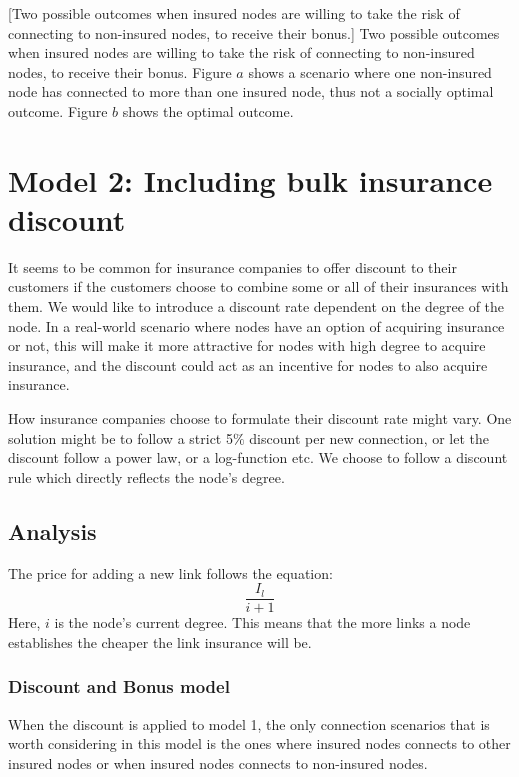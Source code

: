  [Two possible outcomes when insured nodes are willing to take the risk of connecting to non-insured nodes, to receive their bonus.]{\label{fig:bonusviolating} Two possible outcomes when insured nodes are willing to take the risk of connecting to non-insured nodes, to receive their bonus. Figure $a$ shows a scenario where one non-insured node has connected to more than one insured node, thus not a socially optimal outcome. Figure $b$ shows the optimal outcome. }



\section{Model 2: Including bulk insurance discount}

 It seems to be common for insurance companies to offer discount to their customers if the customers choose to combine some or all of their insurances with them. We would like to introduce a discount rate dependent on the degree of the node. In a real-world scenario where nodes have an option of acquiring insurance or not, this will make it more attractive for nodes with high degree to acquire insurance, and the discount could act as an incentive for nodes to also acquire insurance. 

How insurance companies choose to formulate their discount rate might vary. One solution might be to follow a strict 5$\%$ discount per new connection, or let the discount follow a power law, or a log-function etc. We choose to follow a discount rule which directly reflects the node's degree.
\subsection{Analysis}
The price for adding a new link follows the equation:
\begin{equation}
\frac{I_{l}}{i+1}
\label{eq:discount0}
\end{equation}
Here, $i$ is the node's current degree. This means that the more links a node establishes the cheaper the link insurance will be. 

\subsubsection{Discount and Bonus model}
When the discount is applied to model 1, the only connection scenarios that is worth considering in this model is the ones where insured nodes connects to other insured nodes or when insured nodes connects to non-insured nodes.

